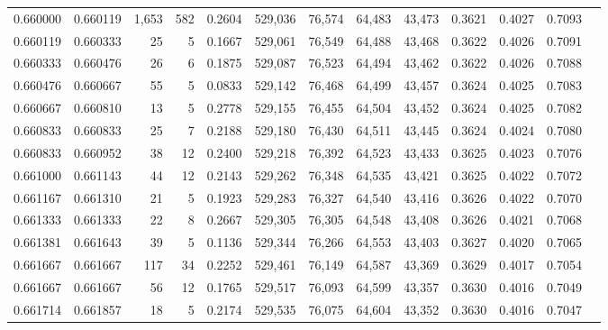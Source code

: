 \begin{tabular}{rrrrrrrrrrrrr}
0.660000 & 0.660119 & 1,653 & 582 &                                     0.2604 & 529,036 &  76,574 &  64,483 &  43,473 & 0.3621 & 0.4027 & 0.7093 \\
0.660119 & 0.660333 &    25 &   5 &                                     0.1667 & 529,061 &  76,549 &  64,488 &  43,468 & 0.3622 & 0.4026 & 0.7091 \\
0.660333 & 0.660476 &    26 &   6 &                                     0.1875 & 529,087 &  76,523 &  64,494 &  43,462 & 0.3622 & 0.4026 & 0.7088 \\
0.660476 & 0.660667 &    55 &   5 &                                     0.0833 & 529,142 &  76,468 &  64,499 &  43,457 & 0.3624 & 0.4025 & 0.7083 \\
0.660667 & 0.660810 &    13 &   5 &                                     0.2778 & 529,155 &  76,455 &  64,504 &  43,452 & 0.3624 & 0.4025 & 0.7082 \\
0.660833 & 0.660833 &    25 &   7 &                                     0.2188 & 529,180 &  76,430 &  64,511 &  43,445 & 0.3624 & 0.4024 & 0.7080 \\
0.660833 & 0.660952 &    38 &  12 &                                     0.2400 & 529,218 &  76,392 &  64,523 &  43,433 & 0.3625 & 0.4023 & 0.7076 \\
0.661000 & 0.661143 &    44 &  12 &                                     0.2143 & 529,262 &  76,348 &  64,535 &  43,421 & 0.3625 & 0.4022 & 0.7072 \\
0.661167 & 0.661310 &    21 &   5 &                                     0.1923 & 529,283 &  76,327 &  64,540 &  43,416 & 0.3626 & 0.4022 & 0.7070 \\
0.661333 & 0.661333 &    22 &   8 &                                     0.2667 & 529,305 &  76,305 &  64,548 &  43,408 & 0.3626 & 0.4021 & 0.7068 \\
0.661381 & 0.661643 &    39 &   5 &                                     0.1136 & 529,344 &  76,266 &  64,553 &  43,403 & 0.3627 & 0.4020 & 0.7065 \\
0.661667 & 0.661667 &   117 &  34 &                                     0.2252 & 529,461 &  76,149 &  64,587 &  43,369 & 0.3629 & 0.4017 & 0.7054 \\
0.661667 & 0.661667 &    56 &  12 &                                     0.1765 & 529,517 &  76,093 &  64,599 &  43,357 & 0.3630 & 0.4016 & 0.7049 \\
0.661714 & 0.661857 &    18 &   5 &                                     0.2174 & 529,535 &  76,075 &  64,604 &  43,352 & 0.3630 & 0.4016 & 0.7047 \\

\end{tabular}
